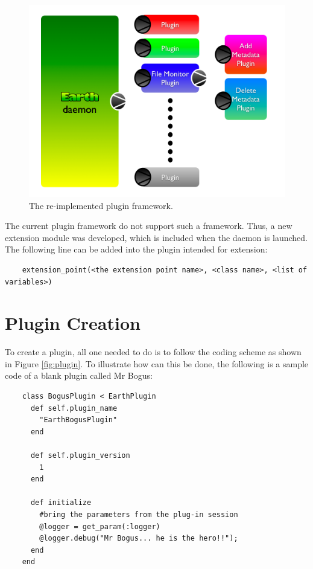 \documentclass{article}
\begin{document}
\begin{figure}[ht]
    \centering
    \includegraphics[scale=0.4]{daemon_plugins.png}
    \caption{The re-implemented plugin framework.}
    \label{fig:framework}
\end{figure}

The current plugin framework do not support such a framework. Thus, a new extension module was developed, which is included when the daemon is launched. The following line can be added into the plugin intended for extension:

\begin{verbatim}
    extension_point(<the extension point name>, <class name>, <list of variables>)
\end{verbatim}


\section{Plugin Creation} %
\label{sec:plugin_creation}

To create a plugin, all one needed to do is to follow the coding scheme as shown in Figure \ref{fig:plugin}. To illustrate how can this be done, the following is a sample code of a blank plugin called Mr Bogus:

\begin{verbatim}
    class BogusPlugin < EarthPlugin
      def self.plugin_name
        "EarthBogusPlugin"
      end

      def self.plugin_version
        1
      end

      def initialize
        #bring the parameters from the plug-in session
        @logger = get_param(:logger)
        @logger.debug("Mr Bogus... he is the hero!!");
      end
    end    
\end{verbatim}
\end{document}
